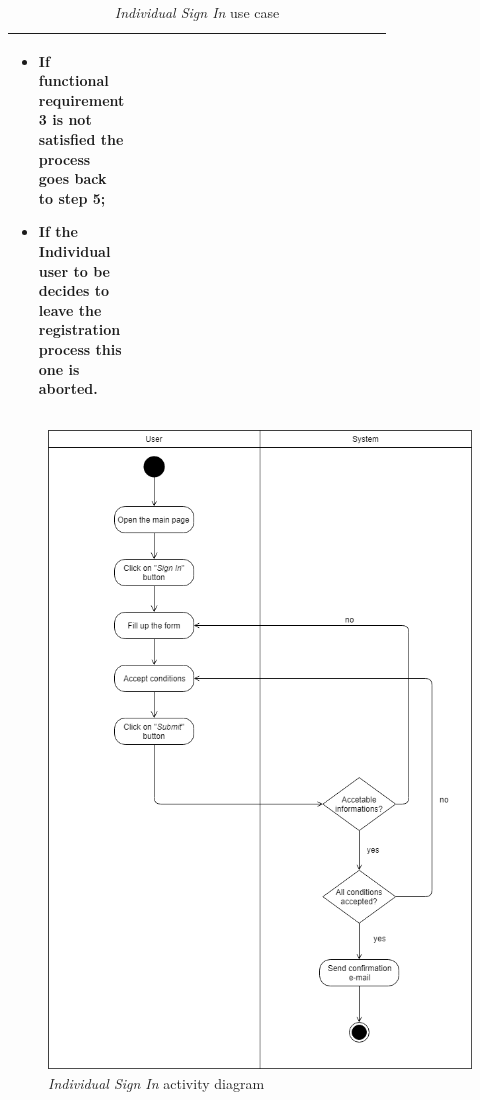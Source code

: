 \begin{center}
\begin{table}[H]
{\begin{tabular}{ | l | p{0.75\linewidth} | }
\begin{minipage}[t]{0.7\textwidth}
\begin{itemize}
      \item If functional requirement 3 is not satisfied the process goes back to step 5;
      \item If the \textbf{Individual user to be} decides to leave the registration process this one is aborted.
    \end{itemize}
    \smallskip
  \end{minipage}  \\ \hline
\end{tabular}}
\caption{\textit{Individual Sign In} use case}
\label{table:individualSignInTable}
\end{table}
\end{center}

\begin{figure}[H]
\begin{center}
  \includegraphics[height=0.6\paperheight]{img/activity/IndividualSignIn.png}
  \hspace{0.05\linewidth}
  \centering
  \caption{\textit{Individual Sign In} activity diagram}
  \label{img:individualSignInActivityDiagram}
\end{center}
\end{figure}


